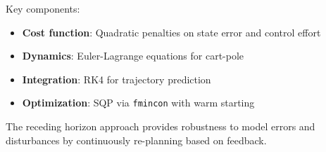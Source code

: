 \documentclass[11pt]{article}
\begin{document}
Key components:
\begin{itemize}
    \item \textbf{Cost function}: Quadratic penalties on state error and control effort
    \item \textbf{Dynamics}: Euler-Lagrange equations for cart-pole
    \item \textbf{Integration}: RK4 for trajectory prediction
    \item \textbf{Optimization}: SQP via \texttt{fmincon} with warm starting
\end{itemize}

The receding horizon approach provides robustness to model errors and disturbances by continuously re-planning based on feedback.
\end{document}
